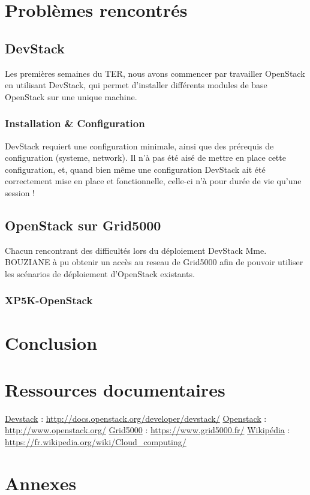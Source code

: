 \documentclass{report}
\begin{document}
\chapter{Problèmes rencontrés}
    \section{DevStack}
        Les premières semaines du TER, nous avons commencer par travailler OpenStack en utilisant DevStack, 
        qui permet d'installer différents modules de base OpenStack sur une unique machine.\break
        \subsection{Installation \& Configuration}
            DevStack requiert une configuration minimale, ainsi que des prérequis de configuration (systeme, 
            network).\break
            Il n'à pas été aisé de mettre en place cette configuration, et, quand bien même une configuration 
            DevStack ait été correctement mise en place et fonctionnelle, celle-ci n'à pour durée de vie qu'une session ! 
            
            
    \section{OpenStack sur Grid5000}
        Chacun rencontrant des difficultés lors du déploiement DevStack Mme. BOUZIANE à pu obtenir un accès au reseau 
        de Grid5000 afin de pouvoir utiliser les scénarios de déploiement d'OpenStack existants.\break
        \subsection{XP5K-OpenStack}
            



\newpage
\chapter*{Conclusion}


\newpage
\chapter*{Ressources documentaires}
\href{http://docs.openstack.org/developer/devstack/}{Devstack} :
\url{http://docs.openstack.org/developer/devstack/}
\bigbreak
\href{http://www.openstack.org/}{Openstack} :
\url{http://www.openstack.org/}
\bigbreak
\href{https://www.grid5000.fr/}{Grid5000} :
\url{https://www.grid5000.fr/}
\bigbreak
\href{https://fr.wikipedia.org/wiki/Cloud_computing/}{Wikipédia} :
\url{https://fr.wikipedia.org/wiki/Cloud_computing/}



\newpage
\chapter*{Annexes}
\end{document}
